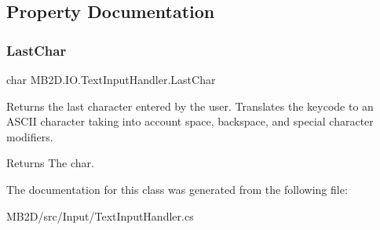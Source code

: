 \subsection{Property Documentation}
\hypertarget{class_m_b2_d_1_1_i_o_1_1_text_input_handler_a874b0ae4b35ff53064c893e49562dfeb}{}\label{class_m_b2_d_1_1_i_o_1_1_text_input_handler_a874b0ae4b35ff53064c893e49562dfeb} 
\subsubsection{\texorpdfstring{Last\+Char}{LastChar}}
{\footnotesize\ttfamily char M\+B2\+D.\+I\+O.\+Text\+Input\+Handler.\+Last\+Char\hspace{0.3cm}{\ttfamily [get]}}



Returns the last character entered by the user. Translates the keycode to an A\+S\+C\+II character taking into account space, backspace, and special character modifiers. 

\begin{DoxyReturn}{Returns}
The char.
\end{DoxyReturn}


The documentation for this class was generated from the following file\+:\begin{DoxyCompactItemize}
\item 
M\+B2\+D/src/\+Input/Text\+Input\+Handler.\+cs\end{DoxyCompactItemize}
